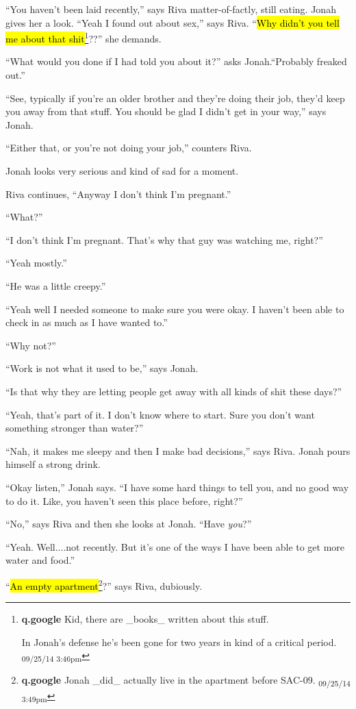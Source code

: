 ``You haven't been laid recently,'' says Riva matter-of-factly, still eating.  Jonah gives her a look.  ``Yeah I found out about sex,'' says Riva.  ``\hl{Why didn't you tell me about that shit}\footnote{\textbf{q.google }Kid, there are \_books\_ written about this stuff.

In Jonah's defense he's been gone for two years in kind of a critical period. \textsubscript{09/25/14 3:46pm}}??'' she demands.

``What would you done if I had told you about it?'' asks Jonah.``Probably freaked out.''

``See, typically if you're an older brother and they're doing their job, they'd keep you away from that stuff.  You should be glad I didn't get in your way,'' says Jonah.

``Either that, or you're not doing your job,'' counters Riva.

Jonah looks very serious and kind of sad for a moment.

Riva continues, ``Anyway I don't think I'm pregnant.''

``What?''

``I don't think I'm pregnant.  That's why that guy was watching me, right?''

``Yeah mostly.''

``He was a little creepy.''

``Yeah well I needed someone to make sure you were okay.  I haven't been able to check in as much as I have wanted to.''

``Why not?''

``Work is not what it used to be,'' says Jonah.

``Is that why they are letting people get away with all kinds of shit these days?''

``Yeah, that's part of it.  I don't know where to start.  Sure you don't want something stronger than water?''

``Nah, it makes me sleepy and then I make bad decisions,'' says Riva.  Jonah pours himself a strong drink.

``Okay listen,'' Jonah says.  ``I have some hard things to tell you, and no good way to do it.  Like, you haven't seen this place before, right?''

``No,'' says Riva and then she looks at Jonah. ``Have \textit{you}?''

``Yeah.  Well....not recently.  But it's one of the ways I have been able to get more water and food.''

``\hl{An empty apartment}\footnote{\textbf{q.google }Jonah \_did\_ actually live in the apartment before SAC-09. \textsubscript{09/25/14 3:49pm}}?'' says Riva, dubiously.

